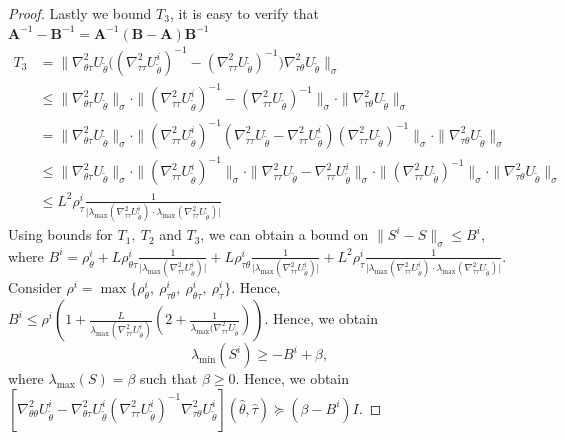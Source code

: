 \documentclass{article}
\def\mA{{\bm{A}}}
\def\mB{{\bm{B}}}
\theoremstyle{definition}
\begin{document}
\begin{proof}
Lastly we bound $T_3$, it is easy to verify that $\mA^{-1}-\mB^{-1}=\mA^{-1}\left(\mB-\mA\right)\mB^{-1}$
\begin{align*}
    T_3&=\|\nabla_{\theta\tau}^2 U_{\tilde\theta} \Big( (\nabla_{\tau\tau}^2 U_{\tilde\theta}^i)^{-1} - (\nabla_{\tau\tau}^2 U_{\tilde\theta})^{-1} \Big) \nabla_{\tau\theta}^2 U_{\tilde\theta} \|_{\sigma}\\
    &\leq \|\nabla_{\theta\tau}^2 U_{\tilde\theta}\|_{\sigma}\cdot\| (\nabla_{\tau\tau}^2 U_{\tilde\theta}^i)^{-1} - (\nabla_{\tau\tau}^2 U_{\tilde\theta})^{-1} \|_{\sigma}\cdot\|\nabla_{\tau\theta}^2 U_{\tilde\theta}\|_{\sigma}\\
     &= \|\nabla_{\theta\tau}^2 U_{\tilde\theta}\|_{\sigma}\cdot\| (\nabla_{\tau\tau}^2 U_{\tilde\theta}^i)^{-1} (\nabla_{\tau\tau}^2 U_{\tilde\theta}-\nabla_{\tau\tau}^2 U_{\tilde\theta}^i) (\nabla_{\tau\tau}^2 U_{\tilde\theta})^{-1} \|_{\sigma}\cdot\|\nabla_{\tau\theta}^2 U_{\tilde\theta}\|_{\sigma}\\
      &\leq \|\nabla_{\theta\tau}^2 U_{\tilde\theta}\|_{\sigma}\cdot\| (\nabla_{\tau\tau}^2 U_{\tilde\theta}^i)^{-1}\|_{\sigma}\cdot \|\nabla_{\tau\tau}^2 U_{\tilde\theta}-\nabla_{\tau\tau}^2 U_{\tilde\theta}^i\|_{\sigma}\cdot
      \|(\nabla_{\tau\tau}^2 U_{\tilde\theta})^{-1} \|_{\sigma}\cdot\|\nabla_{\tau\theta}^2 U_{\tilde\theta}\|_{\sigma}\\
     &\leq L^2\rho_{\tau}^i\frac{1}{\vert\lambda_{\max}(\nabla_{\tau\tau}^2 U_{\tilde\theta}^i)\cdot\lambda_{\max}(\nabla_{\tau\tau}^2 U_{\tilde\theta})\vert}
\end{align*}
Using bounds for $T_1,~T_2$ and $T_3$, we can obtain a bound on $\|S^i-S\|_{\sigma}\leq B^i$, where $B^i=\rho_{\theta}^i+ L\rho_{\theta\tau}^i\frac{1}{\vert\lambda_{\max}(\nabla_{\tau\tau}^2 U_{\tilde\theta}^i)\vert}+L\rho_{\tau\theta}^i\frac{1}{\vert\lambda_{\max}(\nabla_{\tau\tau}^2 U_{\tilde\theta}^i)\vert}+ L^2\rho_{\tau}^i\frac{1}{\vert\lambda_{\max}(\nabla_{\tau\tau}^2 U_{\tilde\theta}^i)\cdot\lambda_{\max}(\nabla_{\tau\tau}^2 U_{\tilde\theta})\vert}$.
Consider $\rho^i=\max\{\rho_{\theta}^i,~\rho_{\tau\theta}^i, ~\rho_{\theta\tau}^i,~\rho_{\tau}^i\}$. Hence, $B^i\le\rho^i\left(1+\frac{L}{\lambda_{\max}(\nabla_{\tau\tau}^2 U_{\tilde\theta}^i)}\left(2+\frac{1}{\lambda_{\max}(\nabla_{\tau\tau}^2 U_{\tilde\theta}}\right)\right)$.
Hence, we obtain
\begin{equation*}
  \lambda_{\min}(S^i)\geq -B^i+\beta,
\end{equation*}
where $\lambda_{\max}(S)=\beta$ such that $\beta\ge 0$.
Hence, we obtain $\left[\nabla_{\theta\theta}^2U_{\tilde\theta}^i-\nabla_{\theta\tau}^2U_{\tilde\theta}^i\left(\nabla_{\tau\tau}^2U_{\tilde\theta}^i\right)^{-1}\nabla_{\tau\theta}^2U_{\tilde\theta}^i\right](\hat\theta,\hat\tau)\succeq(\beta-B^i)I$.

\end{proof}
\end{document}
